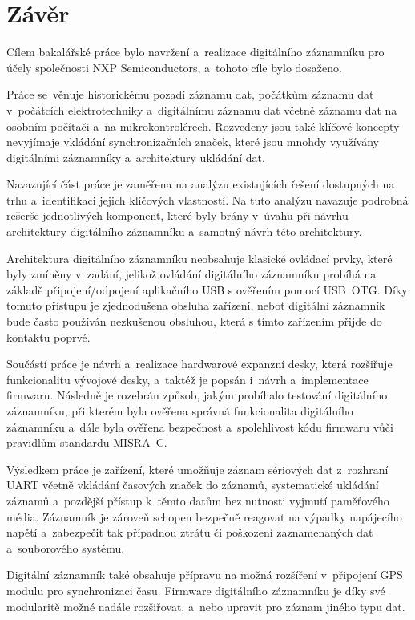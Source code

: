 
\chapter{Závěr}
\label{zaver}
Cílem bakalářské práce bylo navržení a~realizace digitálního záznamníku pro účely společnosti NXP Semiconductors, a~tohoto cíle bylo dosaženo.

Práce se~věnuje historickému pozadí záznamu dat, počátkům záznamu dat v~počátcích elektrotechniky a~digitálnímu záznamu dat včetně záznamu dat na osobním počítači a~na mikrokontrolérech. Rozvedeny jsou také klíčové koncepty nevyjímaje vkládání synchronizačních značek, které jsou mnohdy využívány digitálními záznamníky a~architektury ukládání dat.

Navazující část práce je zaměřena na analýzu existujících řešení dostupných na trhu a~identifikaci jejich klíčových vlastností. Na tuto analýzu navazuje podrobná rešerše jednotlivých komponent, které byly brány v~úvahu při návrhu architektury digitálního záznamníku a~samotný návrh této architektury.

Architektura digitálního záznamníku neobsahuje klasické ovládací prvky, které byly zmíněny v~zadání, jelikož ovládání digitálního záznamníku probíhá na základě připojení/odpojení aplikačního USB s ověřením pomocí USB~OTG. Díky tomuto přístupu je zjednodušena obsluha zařízení, neboť digitální záznamník bude často používán nezkušenou obsluhou, která s tímto zařízením přijde do kontaktu poprvé.

Součástí práce je návrh a~realizace hardwarové expanzní desky, která rozšiřuje funkcionalitu vývojové desky, a~taktéž je popsán i~návrh a~implementace firmwaru. Následně je rozebrán způsob, jakým probíhalo testování digitálního záznamníku, při kterém byla ověřena správná funkcionalita digitálního záznamníku a~dále byla ověřena bezpečnost a~spolehlivost kódu firmwaru vůči pravidlům standardu MISRA~C. 

Výsledkem práce je zařízení, které umožňuje záznam sériových dat z~rozhraní UART včetně vkládání časových značek do záznamů, systematické ukládání záznamů a~pozdější přístup k~těmto datům bez nutnosti vyjmutí paměťového média. Záznamník je zároveň schopen bezpečně reagovat na výpadky napájecího napětí a~zabezpečit tak případnou ztrátu či poškození zaznamenaných dat a~souborového systému. 

Digitální záznamník také obsahuje přípravu na možná rozšíření v~připojení GPS modulu pro synchronizaci času. Firmware digitálního záznamníku je díky své modularitě možné nadále rozšiřovat, a~nebo upravit pro záznam jiného typu dat.

